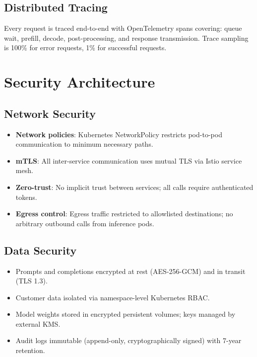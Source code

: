 \documentclass[11pt,a4paper]{article}
\begin{document}
\subsection{Distributed Tracing}

Every request is traced end-to-end with OpenTelemetry spans covering: queue wait, prefill, decode, post-processing, and response transmission. Trace sampling is 100\% for error requests, 1\% for successful requests.

\section{Security Architecture}

\subsection{Network Security}

\begin{itemize}
  \item \textbf{Network policies}: Kubernetes NetworkPolicy restricts pod-to-pod communication to minimum necessary paths.
  \item \textbf{mTLS}: All inter-service communication uses mutual TLS via Istio service mesh.
  \item \textbf{Zero-trust}: No implicit trust between services; all calls require authenticated tokens.
  \item \textbf{Egress control}: Egress traffic restricted to allowlisted destinations; no arbitrary outbound calls from inference pods.
\end{itemize}

\subsection{Data Security}

\begin{itemize}
  \item Prompts and completions encrypted at rest (AES-256-GCM) and in transit (TLS 1.3).
  \item Customer data isolated via namespace-level Kubernetes RBAC.
  \item Model weights stored in encrypted persistent volumes; keys managed by external KMS.
  \item Audit logs immutable (append-only, cryptographically signed) with 7-year retention.
\end{itemize}
\end{document}
